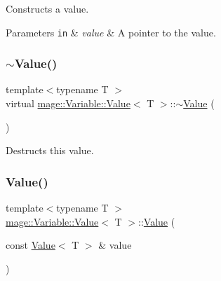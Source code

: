 Constructs a value.


\begin{DoxyParams}[1]{Parameters}
\mbox{\tt in}  & {\em value} & A pointer to the value. \\
\hline
\end{DoxyParams}
\hypertarget{structmage_1_1_variable_1_1_value_ab0b88d59c1049b89557fbaf649a3b459}{}\label{structmage_1_1_variable_1_1_value_ab0b88d59c1049b89557fbaf649a3b459} 
\subsubsection{\texorpdfstring{$\sim$\+Value()}{~Value()}}
{\footnotesize\ttfamily template$<$typename T $>$ \\
virtual \hyperlink{structmage_1_1_variable_1_1_value}{mage\+::\+Variable\+::\+Value}$<$ T $>$\+::$\sim$\hyperlink{structmage_1_1_variable_1_1_value}{Value} (\begin{DoxyParamCaption}{ }\end{DoxyParamCaption})\hspace{0.3cm}{\ttfamily [virtual]}}

Destructs this value. \hypertarget{structmage_1_1_variable_1_1_value_a083583e9c9c59eae659db2bfdf4b6629}{}\label{structmage_1_1_variable_1_1_value_a083583e9c9c59eae659db2bfdf4b6629} 
\subsubsection{\texorpdfstring{Value()}{Value()}\hspace{0.1cm}{\footnotesize\ttfamily [2/2]}}
{\footnotesize\ttfamily template$<$typename T $>$ \\
\hyperlink{structmage_1_1_variable_1_1_value}{mage\+::\+Variable\+::\+Value}$<$ T $>$\+::\hyperlink{structmage_1_1_variable_1_1_value}{Value} (\begin{DoxyParamCaption}\item[{const \hyperlink{structmage_1_1_variable_1_1_value}{Value}$<$ T $>$ \&}]{value }\end{DoxyParamCaption})\hspace{0.3cm}{\ttfamily [private]}}

